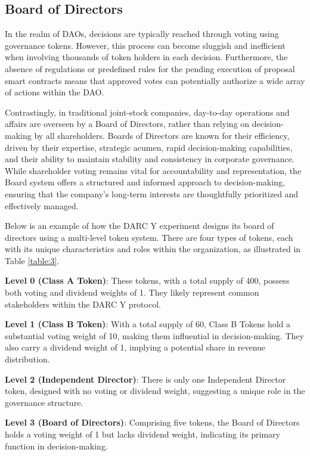 \documentclass[main.tex]{subfiles}
\begin{document}
\subsection{Board of Directors}

In the realm of DAOs, decisions are typically reached through voting using governance tokens. However, this process can become sluggish and inefficient when involving thousands of token holders in each decision. Furthermore, the absence of regulations or predefined rules for the pending execution of proposal smart contracts means that approved votes can potentially authorize a wide array of actions within the DAO.

Contrastingly, in traditional joint-stock companies, day-to-day operations and affairs are overseen by a Board of Directors, rather than relying on decision-making by all shareholders. Boards of Directors are known for their efficiency, driven by their expertise, strategic acumen, rapid decision-making capabilities, and their ability to maintain stability and consistency in corporate governance. While shareholder voting remains vital for accountability and representation, the Board system offers a structured and informed approach to decision-making, ensuring that the company's long-term interests are thoughtfully prioritized and effectively managed.


Below is an example of how the DARC Y experiment designs its board of directors using a multi-level token system. There are four types of tokens, each with its unique characteristics and roles within the organization, as illustrated in Table \ref{table:3}.

\textbf{Level 0 (Class A Token)}: These tokens, with a total supply of 400, possess both voting and dividend weights of 1. They likely represent common stakeholders within the DARC Y protocol.

\textbf{Level 1 (Class B Token)}: With a total supply of 60, Class B Tokens hold a substantial voting weight of 10, making them influential in decision-making. They also carry a dividend weight of 1, implying a potential share in revenue distribution.

\textbf{Level 2 (Independent Director)}: There is only one Independent Director token, designed with no voting or dividend weight, suggesting a unique role in the governance structure.

\textbf{Level 3 (Board of Directors)}: Comprising five tokens, the Board of Directors holds a voting weight of 1 but lacks dividend weight, indicating its primary function in decision-making.
\end{document}
